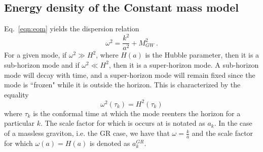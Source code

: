 \documentclass[prd,twocolumn,aps,psfig,nofootinbib,nobibnotes,superscriptaddress,preprintnumbers,times]{revtex4-2}
\begin{document}
\subsection{Energy density of the Constant mass model}
Eq.\ \ref{eqn:eom} yields the dispersion relation
\begin{equation}\label{eqn:disp}
    \omega^2 = \frac{k^2}{a^2} + M_{GW}^2\ .
\end{equation}
 For a given mode, if $\omega^2 \gg H^2$, where $H(a)$ is the Hubble parameter, then it is a sub-horizon mode and if $\omega^2 \ll H^2$, then it is a super-horizon mode. A sub-horizon mode will decay with time, and a super-horizon mode will remain fixed since the mode is ``frozen" while it is outside the horizon. This is characterized by the equality  
 \begin{equation}\label{eqn:om_H}
     \omega^2(\tau_k) = H^2(\tau_k)
 \end{equation} where $\tau_k$ is the conformal time at which the mode reenters the horizon for a particular $k$. The scale factor for which is occurs at is notated as $a_k$. In the case of a massless graviton, i.e. the GR case, we have that $\omega = \frac{k}{a}$ and the scale factor for which $\omega(a) = H(a)$ is denoted as $a_{k}^{GR}$.
\end{document}
